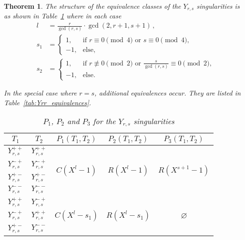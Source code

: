 \documentclass[noend]{amsproc}
\newtheorem{theorem}{Theorem}
\theoremstyle{definition}
\begin{document}
\begin{theorem}
The structure of the equivalence classes of the $Y_{r,s}$ singularities is as
shown in Table~\ref{tab:Yrs_equivalences} where in each case
\begin{align*}
l &= \frac{r}{\gcd(r,s)} \cdot \gcd(2, r+1, s+1) \,, \\
s_1 &=
\begin{cases}
  1,  &\text{if } r \equiv 0 \pmod{4} \text{ or } s \equiv 0 \pmod{4}, \\
  -1, &\text{else,}
\end{cases} \\
s_2 &=
\begin{cases}
  1,  &\text{if } r \not\equiv 0 \pmod{2}
      \text{ or } \frac{s}{\gcd(r,s)} \equiv 0 \pmod{2}, \\
  -1, &\text{else.}
\end{cases}
\end{align*}

In the special case where $r = s$, additional equivalences occur. They are
listed in Table~\ref{tab:Yrr_equivalences}.

\begin{table}[htb]
\centering
\caption{$P_1$, $P_2$ and $P_3$ for the $Y_{r,s}$ singularities}
\label{tab:Yrs_equivalences}
\begin{tabular}{|c|c||c|c|c|}
\hline

$T_1$ & $T_2$ & $P_1(T_1, T_2)$ & $P_2(T_1, T_2)$ & $P_3(T_1, T_2)$ \\
\hline\hline

$Y_{r,s}^{++}$ & $Y_{r,s}^{++}$ &
\multirow{4}{*}{$C(X^l-1)$} &
\multirow{4}{*}{$R(X^l-1)$} &
\multirow{4}{*}{$R(X^{s+1}-1)$}
\\ \cline{1-2}

$Y_{r,s}^{-+}$ & $Y_{r,s}^{-+}$ &&&
\\ \cline{1-2}

$Y_{r,s}^{+-}$ & $Y_{r,s}^{+-}$ &&&
\\ \cline{1-2}

$Y_{r,s}^{--}$ & $Y_{r,s}^{--}$ &&&
\\ \hline


$Y_{r,s}^{++}$ & $Y_{r,s}^{-+}$ &
\multirow{4}{*}{$C(X^l-s_1)$} &
\multirow{4}{*}{$R(X^l-s_1)$} &
\multirow{4}{*}{$\varnothing$}
\\ \cline{1-2}

$Y_{r,s}^{-+}$ & $Y_{r,s}^{++}$ &&&
\\ \cline{1-2}

$Y_{r,s}^{+-}$ & $Y_{r,s}^{--}$ &&&
\\ \cline{1-2}


\end{tabular}
\end{table}
\end{theorem}
\end{document}
